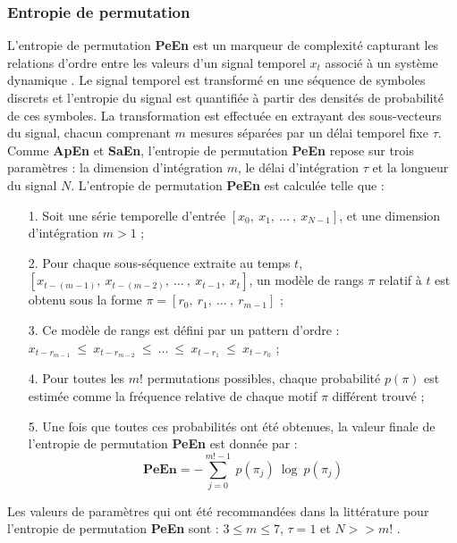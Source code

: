 \subsubsection*{Entropie de permutation}

L'entropie de permutation \textbf{PeEn} est un marqueur de complexité capturant les relations d'ordre entre les valeurs d'un signal temporel $x_t$ associé à un système dynamique \citep{bandt2002permutation}. 
Le signal temporel est transformé en une séquence de symboles discrets et l'entropie du signal est quantifiée à partir des densités de probabilité de ces symboles. 
La transformation est effectuée en extrayant des sous-vecteurs du signal, chacun comprenant $m$ mesures séparées par un délai temporel fixe $\tau$. 
Comme \textbf{ApEn} et \textbf{SaEn}, l'entropie de permutation \textbf{PeEn} repose sur trois paramètres : la dimension d'intégration $m$, le délai d'intégration $\tau$ et la longueur du signal $N$.
L'entropie de permutation \textbf{PeEn} est calculée telle que : \\

\begin{itemize}
\item[1.] Soit une série temporelle d'entrée $[x_0,~x_1,~\ldots~,~x_{N-1}]$, et une dimension d'intégration $m>1$ ;
\item[2.] Pour chaque sous-séquence extraite au temps $t$, $[x_{t-(m-1)},~x_{t-(m-2)},~\ldots~,~x_{t-1},~x_t]$, un modèle de rangs $\pi$ relatif à $t$ est obtenu sous la forme $\pi=[r_0,~r_1,~\ldots~,~r_{m-1}]$ ; 
\item[3.] Ce modèle de rangs est défini par un pattern d'ordre : $x_{t-r_{m-1}}~\leq~x_{t-r_{m-2}}~\leq~\ldots~\leq~x_{t-r_1}~\leq~x_{t-r_0}$ ; 
\item[4.] Pour toutes les $m!$ permutations possibles, chaque probabilité $p(\pi)$ est estimée comme la fréquence relative de chaque motif $\pi$ différent trouvé ; 
\item[5.] Une fois que toutes ces probabilités ont été obtenues, la valeur finale de l'entropie de permutation \textbf{PeEn} est donnée par :
\begin{equation}
\textbf{PeEn} = -\sum_{j=0}^{m!-1}~p(\pi_j)~\log~p(\pi_j)
\end{equation}
\end{itemize}

Les valeurs de paramètres qui ont été recommandées dans la littérature pour l'entropie de permutation \textbf{PeEn} sont : $3 \leq m \leq 7$, $\tau = 1$ et $N>>m!$ \citep{bandt2002permutation, cuesta2019embedded}. 

